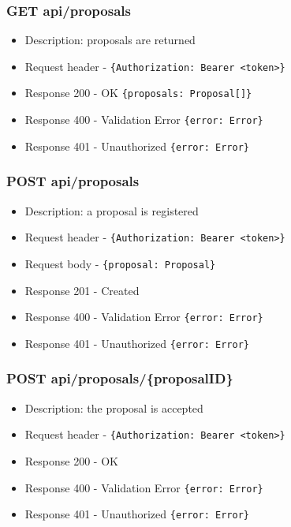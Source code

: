 \subsubsection{GET api/proposals}
\begin{itemize}
    \item Description: proposals are returned
    \item Request header - \verb|{Authorization: Bearer <token>}|
    \item Response 200 - OK \verb|{proposals: Proposal[]}|
    \item Response 400 - Validation Error \verb|{error: Error}|
    \item Response 401 - Unauthorized \verb|{error: Error}|
\end{itemize}

\subsubsection{POST api/proposals}
\begin{itemize}
    \item Description: a proposal is registered
    \item Request header - \verb|{Authorization: Bearer <token>}|
    \item Request body - \verb|{proposal: Proposal}|
    \item Response 201 - Created
    \item Response 400 - Validation Error \verb|{error: Error}|
    \item Response 401 - Unauthorized \verb|{error: Error}|
\end{itemize}

\subsubsection{POST api/proposals/\{proposalID\}}
\begin{itemize}
    \item Description: the proposal is accepted
    \item Request header - \verb|{Authorization: Bearer <token>}|
    \item Response 200 - OK
    \item Response 400 - Validation Error \verb|{error: Error}|
    \item Response 401 - Unauthorized \verb|{error: Error}|
\end{itemize}

